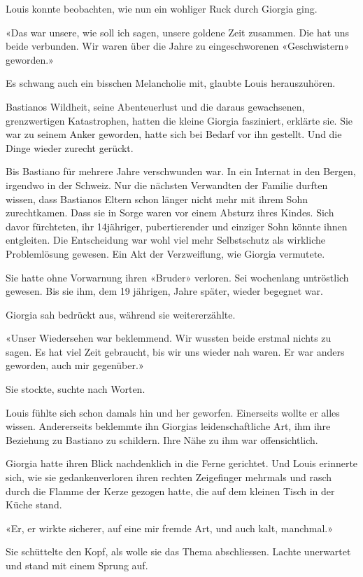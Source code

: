 Louis konnte beobachten, wie nun ein wohliger Ruck durch Giorgia ging.

«Das war unsere, wie soll ich sagen, unsere goldene Zeit zusammen. Die
hat uns beide verbunden. Wir waren über die Jahre zu eingeschworenen
«Geschwistern» geworden.»

Es schwang auch ein bisschen Melancholie mit, glaubte Louis
herauszuhören.

Bastianos Wildheit, seine Abenteuerlust und die daraus gewachsenen,
grenzwertigen Katastrophen, hatten die kleine Giorgia fasziniert,
erklärte sie. Sie war zu seinem Anker geworden, hatte sich bei Bedarf
vor ihn gestellt. Und die Dinge wieder zurecht gerückt.

Bis Bastiano für mehrere Jahre verschwunden war. In ein Internat in den
Bergen, irgendwo in der Schweiz. Nur die nächsten Verwandten der Familie
durften wissen, dass Bastianos Eltern schon länger nicht mehr mit ihrem
Sohn zurechtkamen. Dass sie in Sorge waren vor einem Absturz ihres
Kindes. Sich davor fürchteten, ihr 14jähriger, pubertierender und
einziger Sohn könnte ihnen entgleiten. Die Entscheidung war wohl viel
mehr Selbstschutz als wirkliche Problemlösung gewesen. Ein Akt der
Verzweiflung, wie Giorgia vermutete.

Sie hatte ohne Vorwarnung ihren «Bruder» verloren. Sei wochenlang
untröstlich gewesen. Bis sie ihm, dem 19 jährigen, Jahre später, wieder
begegnet war.

Giorgia sah bedrückt aus, während sie weitererzählte.

«Unser Wiedersehen war beklemmend. Wir wussten beide erstmal nichts zu
sagen. Es hat viel Zeit gebraucht, bis wir uns wieder nah waren. Er war
anders geworden, auch mir gegenüber.»

Sie stockte, suchte nach Worten.

Louis fühlte sich schon damals hin und her geworfen. Einerseits wollte
er alles wissen. Andererseits beklemmte ihn Giorgias leidenschaftliche
Art, ihm ihre Beziehung zu Bastiano zu schildern. Ihre Nähe zu ihm war
offensichtlich.

Giorgia hatte ihren Blick nachdenklich in die Ferne gerichtet. Und Louis
erinnerte sich, wie sie gedankenverloren ihren rechten Zeigefinger
mehrmals und rasch durch die Flamme der Kerze gezogen hatte, die auf dem
kleinen Tisch in der Küche stand.

«Er, er wirkte sicherer, auf eine mir fremde Art, und auch kalt,
manchmal.»

Sie schüttelte den Kopf, als wolle sie das Thema abschliessen. Lachte
unerwartet und stand mit einem Sprung auf.

